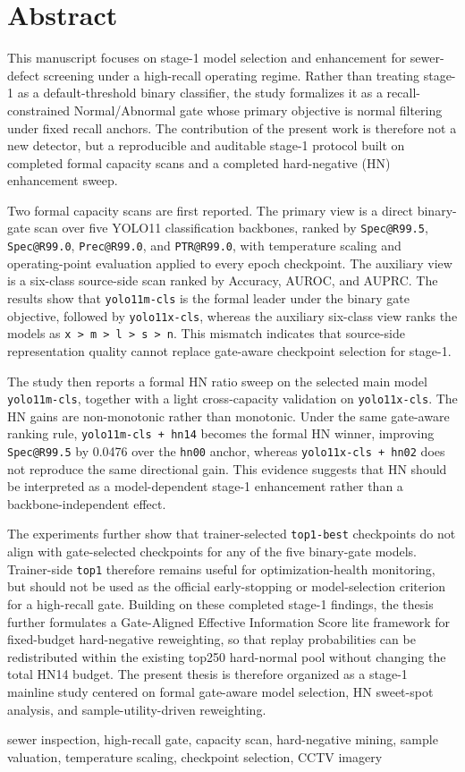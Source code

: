 \documentclass[UTF8,openany,12pt]{ctexbook}
\newcommand{\engkeywords}[1]{\par\noindent{\bfseries Key words:}#1}
\newcommand{\formalmetric}[1]{\texttt{#1}}
\begin{document}
\chapter*{Abstract}
This manuscript focuses on stage-1 model selection and enhancement for sewer-defect screening under a high-recall operating regime. Rather than treating stage-1 as a default-threshold binary classifier, the study formalizes it as a recall-constrained Normal/Abnormal gate whose primary objective is normal filtering under fixed recall anchors. The contribution of the present work is therefore not a new detector, but a reproducible and auditable stage-1 protocol built on completed formal capacity scans and a completed hard-negative (HN) enhancement sweep.

Two formal capacity scans are first reported. The primary view is a direct binary-gate scan over five YOLO11 classification backbones, ranked by \formalmetric{Spec@R99.5}, \formalmetric{Spec@R99.0}, \formalmetric{Prec@R99.0}, and \formalmetric{PTR@R99.0}, with temperature scaling and operating-point evaluation applied to every epoch checkpoint. The auxiliary view is a six-class source-side scan ranked by Accuracy, AUROC, and AUPRC. The results show that \texttt{yolo11m-cls} is the formal leader under the binary gate objective, followed by \texttt{yolo11x-cls}, whereas the auxiliary six-class view ranks the models as \texttt{x > m > l > s > n}. This mismatch indicates that source-side representation quality cannot replace gate-aware checkpoint selection for stage-1.

The study then reports a formal HN ratio sweep on the selected main model \texttt{yolo11m-cls}, together with a light cross-capacity validation on \texttt{yolo11x-cls}. The HN gains are non-monotonic rather than monotonic. Under the same gate-aware ranking rule, \texttt{yolo11m-cls + hn14} becomes the formal HN winner, improving \formalmetric{Spec@R99.5} by 0.0476 over the \texttt{hn00} anchor, whereas \texttt{yolo11x-cls + hn02} does not reproduce the same directional gain. This evidence suggests that HN should be interpreted as a model-dependent stage-1 enhancement rather than a backbone-independent effect.

The experiments further show that trainer-selected \formalmetric{top1-best} checkpoints do not align with gate-selected checkpoints for any of the five binary-gate models. Trainer-side \formalmetric{top1} therefore remains useful for optimization-health monitoring, but should not be used as the official early-stopping or model-selection criterion for a high-recall gate. Building on these completed stage-1 findings, the thesis further formulates a Gate-Aligned Effective Information Score lite framework for fixed-budget hard-negative reweighting, so that replay probabilities can be redistributed within the existing top250 hard-normal pool without changing the total HN14 budget. The present thesis is therefore organized as a stage-1 mainline study centered on formal gate-aware model selection, HN sweet-spot analysis, and sample-utility-driven reweighting.
\engkeywords{sewer inspection, high-recall gate, capacity scan, hard-negative mining, sample valuation, temperature scaling, checkpoint selection, CCTV imagery}
\end{document}
